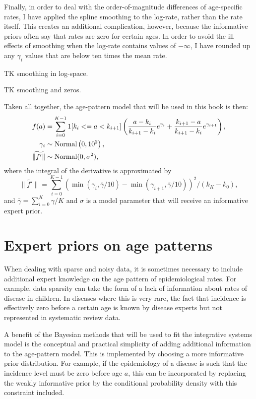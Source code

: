 Finally, in order to deal with the order-of-magnitude differences of
age-specific rates, I have applied the spline smoothing to the
log-rate, rather than the rate itself.  This creates an additional
complication, however, because the informative priors often say that
rates are zero for certain ages.  In order to avoid the ill effects of
smoothing when the log-rate contains values of $-\infty$, I have
rounded up any $\gamma_i$ values that are below ten times the mean
rate.

TK smoothing in log-space.

TK smoothing and zeros.



Taken all together, the age-pattern model that will be used in this
book is then:
\begin{align*}
f(a) &= \sum_{i=0}^{K-1} 1[k_i <= a < k_{i+1}]\left( \frac{a-k_i}{k_{i+1}-k_i} e^{\gamma_i} + \frac{k_{i+1}-a}{k_{i+1}-k_i} e^{\gamma_{i+1}}\right),\\
\gamma_i &\sim \operatorname{Normal}\left(0, 10^2\right),\\
\widetilde{\|f'\|} &\sim \operatorname{Normal}(0, \sigma^2),\\
\end{align*}
where the integral of the derivative is approximated by
\[
\widetilde{\|f'\|} = \sum_{i=0}^{K-1}(\min(\gamma_i, \bar\gamma/10) -
\min(\gamma_{i+1}, \bar\gamma/10))^2/(k_K-k_0),
\]
and $\bar\gamma =
\sum_{i=0}^K \gamma/K$ and $\sigma$ is a model parameter that will
receive an informative expert prior.




\chapter{Expert priors on age patterns}

When dealing with sparse and noisy data, it is sometimes necessary to
include additional expert knowledge on the age pattern of
epidemiological rates.  For example, data sparsity can take the form
of a lack of information about rates of disease in children.  In
diseases where this is very rare, the fact that incidence is
effectively zero before a certain age is known by disease experts but
not represented in systematic review data.

A benefit of the Bayesian methods that will be used to fit the
integrative systems model is the conceptual and practical simplicity
of adding additional information to the age-pattern model.  This is
implemented by choosing a more informative prior distribution.  For
example, if the epidemiology of a disease is such that the incidence
level must be zero before age $a$, this can be incorporated by
replacing the weakly informative prior by the conditional probability
density with this constraint included.


